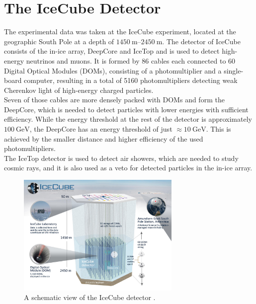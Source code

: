 \section{The IceCube Detector}
\label{sec:Detector}

The experimental data was taken at the IceCube experiment, located at the geographic South Pole at a depth of $\qtyrange{1450}{2450}{\metre}$.
The detector of IceCube consists of the in-ice array, DeepCore and IceTop and is used to detect high-energy neutrinos and muons.
It is formed by
86 cables each connected to 60 Digital Optical Modules (DOMs), consisting of a photomultiplier and a single-board computer, resulting in a total 
of 5160 photomultipliers detecting weak Cherenkov light of high-energy charged particles.\\
Seven of those cables are more densely packed with DOMs and form the DeepCore, which is needed to detect particles with lower energies with sufficient efficiency. While 
the energy threshold at the rest of the detector is approximately $\qty{100}{\giga\electronvolt}$, the DeepCore has an energy threshold of just $\approx \qty{10}{\giga\electronvolt}$.
This is achieved by the smaller distance and higher efficiency of the used photomultipliers.\\
The IceTop detector is used to detect air showers, which are needed to study cosmic rays, and it is also used as a veto for detected particles in the in-ice array.
\begin{figure}
    \centering
    \includegraphics[width=0.7\textwidth]{content/pics/icecube_detector.jpg}
    \caption{A schematic view of the IceCube detector \cite{IceCube_pic}.}
    \label{fig:bb_oscillation}
\end{figure}

